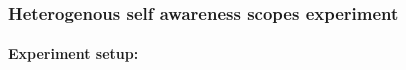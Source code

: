 			
			
			
			
	
	
		\subsubsection{Heterogenous self awareness scopes experiment}
		
			\paragraph{Experiment setup:\nl}
			
